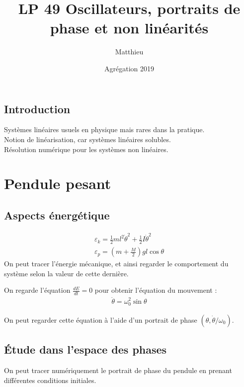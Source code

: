 \documentclass[12pt,prb,aps,epsf]{article}
\begin{document}
	
	\title{LP 49 Oscillateurs, portraits de phase et non linéarités}
	\author{Matthieu}
	\date{Agrégation 2019}
	
	\maketitle
	
	\tableofcontents
	
	\pagebreak
	
\subsection{Introduction}
	Systèmes linéaires usuels en physique mais rares dans la pratique.\\
	Notion de linéarisation, car systèmes linéaires solubles.\\
	Résolution numérique pour les systèmes non linéaires.
	
\section{Pendule pesant}
\subsection{Aspects énergétique}
\begin{eqnarray}
\varepsilon_k = \frac{1}{2}ml^2\dot{\theta}^2 + \frac{1}{2}I\dot{\theta}^2\\
\varepsilon_p = \left(m+\frac{M}{2}\right)gl\cos\theta
\end{eqnarray}
	On peut tracer l'énergie mécanique, et ainsi regarder le comportement du système selon la valeur de cette dernière.
	
On regarde l'équation $\frac{dE}{dt}=0$ pour obtenir l'équation du mouvement : 
\begin{eqnarray}
\ddot{\theta} = \omega_0^2\sin\theta
\end{eqnarray}

On peut regarder cette équation à l'aide d'un portrait de phase $(\theta,\dot{\theta}/\omega_0)$.

\subsection{Étude dans l'espace des phases}
	
	On peut tracer numériquement le portrait de phase du pendule en prenant différentes conditions initiales.\\
	
\end{document}
